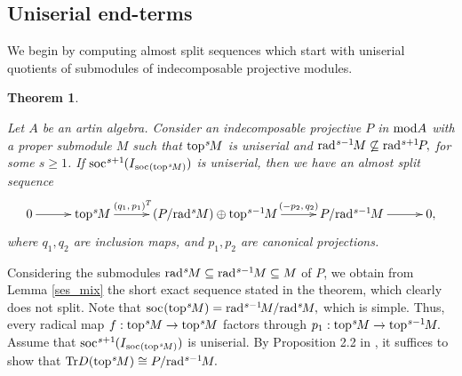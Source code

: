 \documentclass[10pt]{amsart}
\newtheorem{Theo}{Theorem}[subsection]
\theoremstyle{definition}
\newcommand{\mmod}{{\rm mod}}
\newcommand{\rad}{{\rm rad}\hspace{.5pt}}
\newcommand{\soc}{{\rm soc}\hspace{.5pt}}
\newcommand{\ntop}{{\rm top}\hspace{.5pt}}
\begin{document}
\subsection{\sc Uniserial end-terms} We begin by computing almost split sequences which start with uniserial quotients of submodules of indecomposable projective modules.

\begin{Theo}\label{ass_uni_topi}

Let $A$ be an artin algebra. Consider an indecomposable projective $P$ in $\mmod A$ with a proper submodule $M$ such that $\ntop^s\hspace{-1pt}M$ is uniserial and $\rad^{s-1}\hspace{-1pt}M\not\subseteq \rad^{s+1}\hspace{-1pt}P,$ for some $s\ge 1$. If $\soc^{s+1}\hspace{-.5pt}(I_{\hspace{.5pt}\soc(\ntop^s\hspace{-1pt}M)})$ is uniserial, then we have an almost split sequence \vspace{-5pt}
$$\xymatrixcolsep{28pt}\xymatrix{
0 \ar[r] & \ntop^s\hspace{-1pt}M \ar[r]^-{(q_1, \,p_1)^T\hspace{-2pt}}& (P/\rad^s\hspace{-1pt}M) \oplus 
\ntop^{s-1}\hspace{-1pt}M \ar[r]^-{(-p_2, \,q_2)} & P/\rad^{s-1}\hspace{-1pt}M \ar[r] & 0,
} \vspace{-4pt} $$ where $q_1, q_2$ are inclusion maps, and $p_1, p_2$ are canonical projections. 

\end{Theo}

\vspace{-1pt}

 Considering the submodules $\rad^s\hspace{-1pt}M \subseteq \rad^{s-1}\hspace{-1pt}M \subseteq M$ of $P$, we obtain from Lemma \ref{ses_mix} the short exact sequence stated in the theorem, which clearly does not split. Note that %
$\soc(\ntop^s\hspace{-1pt}M)=\rad^{s-1}\hspace{-1.5pt}M/\rad^s\hspace{-1pt}M,
$ which is simple. Thus, every radical map $f: \ntop^s\hspace{-1pt}M\to \ntop^s\hspace{-1pt}M$ factors through $p_1: \ntop^s\hspace{-1pt}M\to \ntop^{s-1}\hspace{-1pt}M.$ Assume that $\soc^{s+1}\hspace{-.5pt}(I_{\hspace{.5pt}\soc(\ntop^s\hspace{-1pt}M)})$ is uniserial.  By Proposition 2.2 in \cite[Chapter V]{ARS}, it suffices to show that ${\rm Tr}D(\ntop^s\hspace{-1pt}M)\cong P/\rad^{s-1}\hspace{-1pt}M.$
\end{document}
